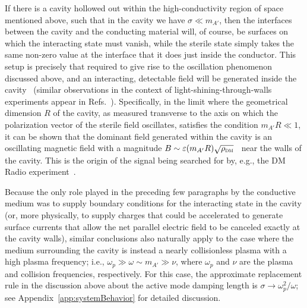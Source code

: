 \documentclass[amsmath,amssymb,aps,10pt,prd,letterpaper,nofootinbib,balancelastpage,notitlepage,superscriptaddress,twocolumn,floatfix]{revtex4-2}
\newcommand{\appref}[2][x]{Appendi{#1}~\ref{#2}}	%
\newcommand{\citeR}[2][]{Ref{#1}.~\cite{#2}}		%
\begin{document}
If there is a cavity hollowed out within the high-conductivity region of space mentioned above, such that in the cavity we have $\sigma \ll m_{A'}$, then the interfaces between the cavity and the conducting material will, of course, be surfaces on which the interacting state must vanish, while the sterile state simply takes the same non-zero value at the interface that it does just inside the conductor.
This setup is precisely that required to give rise to the oscillation phenomenon discussed above, and an interacting, detectable field will be generated inside the cavity~\cite{Graham:2014sha} (similar observations in the context of light-shining-through-walls experiments appear in \citeR[s]{Okun:1982xi,Ahlers:2007rd,Jaeckel:2007ch}).
Specifically, in the limit where the geometrical dimension $R$ of the cavity, as measured transverse to the axis on which the polarization vector of the sterile field oscillates, satisfies the condition $m_{A'}R \ll 1$, it can be shown that the dominant field generated within the cavity is an oscillating magnetic field with a magnitude $B \sim \varepsilon (m_{A'}R) \sqrt{\rho_{\textsc{dm}}}$~\cite{Chaudhuri:2014dla} near the walls of the cavity.
This is the origin of the signal being searched for by, e.g., the DM Radio experiment~\cite{Chaudhuri:2014dla,Silva-Feaver:2016qhh,Phipps:2019cqy}. 

Because the only role played in the preceding few paragraphs by the conductive medium was to supply boundary conditions for the interacting state in the cavity (or, more physically, to supply charges that could be accelerated to generate surface currents that allow the net parallel electric field to be canceled exactly at the cavity walls), similar conclusions also naturally apply to the case where the medium surrounding the cavity is instead a nearly collisionless plasma with a high plasma frequency; i.e., $\omega_p \gg \omega \sim m_{A'} \gg \nu$, where $\omega_p$ and $\nu$ are the plasma and collision frequencies, respectively.
For this case, the approximate replacement rule in the discussion above about the active mode damping length is $\sigma \rightarrow \omega_p^2 / \omega$;
see \appref{app:systemBehavior} for detailed discussion.
\end{document}
